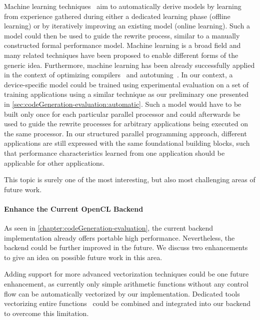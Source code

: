Machine learning techniques~\cite{Bishop2007} aim to automatically derive models by learning from experience gathered during either a dedicated learning phase (offline learning) or by iteratively improving an existing model (online learning).
Such a model could then be used to guide the rewrite process, similar to a manually constructed formal performance model.
Machine learning is a broad field and many related techniques have been proposed to enable different forms of the generic idea.
Furthermore, machine learning has been already successfully applied in the context of optimizing compilers~\cite{DubachJBFO09} and autotuning~\cite{CollinsFLC13}.
In our context, a device-specific model could be trained using experimental evaluation on a set of training applications using a similar technique as our preliminary one presented in \autoref{sec:codeGeneration-evaluation:automatic}.
Such a model would have to be built only once for each particular parallel processor and could afterwards be used to guide the rewrite processes for arbitrary applications being executed on the same processor.
In our structured parallel programming approach, different applications are still expressed with the same foundational building blocks, such that performance characteristics learned from one application should be applicable for other applications.

\bigskip
This topic is surely one of the most interesting, but also most challenging areas of future work.

\paragraph{Enhance the Current OpenCL Backend}
As seen in \autoref{chapter:codeGeneration-evaluation}, the current \OpenCL backend implementation already offers portable high performance.
Nevertheless, the backend could be further improved in the future.
We discuss two enhancements to give an idea on possible future work in this area.

Adding support for more advanced vectorization techniques could be one future enhancement, as currently only simple arithmetic functions without any control flow can be automatically vectorized by our implementation.
Dedicated tools vectorizing entire functions~\cite{KarrenbergHa2011} could be combined and integrated into our backend to overcome this limitation.

